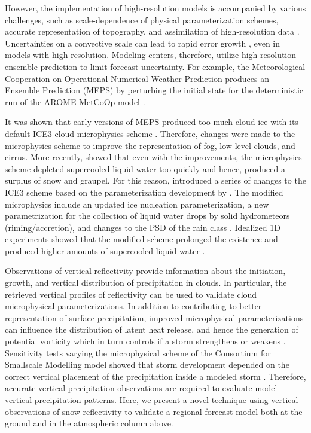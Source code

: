 \documentclass{ametsocV5}
\begin{document}
    However, the implementation of high-resolution models is accompanied by various challenges, such as scale-dependence of physical parameterization schemes, accurate representation of topography, and assimilation of high-resolution data \citep{sun_convective-scale_2005}. Uncertainties on a convective scale can lead to rapid error growth \citep{lorenz_atmospheric_1969}, even in models with high resolution. Modeling centers, therefore, utilize high-resolution ensemble prediction to limit forecast uncertainty. For example, the Meteorological Cooperation on Operational Numerical Weather Prediction produces an Ensemble Prediction (MEPS) by perturbing the initial state for the deterministic run of the  AROME-MetCoOp model \citep{frogner_convection-permitting_2019}. 
    
    It was shown that early versions of MEPS produced too much cloud ice with its default ICE3 cloud microphysics scheme \citep{muller_arome-metcoop:_2017}. Therefore, changes were made to the microphysics scheme to improve the representation of fog, low-level clouds, and cirrus. More recently, \citet{engdahl_improving_2020} showed that even with the improvements, the microphysics scheme depleted supercooled liquid water too quickly and hence, produced a surplus of snow and graupel. For this reason, \citet{engdahl_improving_2020} introduced a series of changes to the ICE3 scheme based on the parameterization development by \citet{thompson_explicit_2004,thompson_explicit_2008}. The modified microphysics include an updated ice nucleation parameterization, a new parametrization for the collection of liquid water drops by solid hydrometeors (riming/accretion), and changes to the PSD of the rain class \citep{engdahl_improving_2020}. Idealized 1D experiments showed that the modified scheme prolonged the existence and produced higher amounts of supercooled liquid water \citep{engdahl_improving_2020}.

    Observations of vertical reflectivity provide information about the initiation, growth, and vertical distribution of precipitation in clouds. In particular, the retrieved vertical profiles of reflectivity can be used to validate cloud microphysical parameterizations. In addition to contributing to better representation of surface precipitation, improved microphysical parameterizations can influence the distribution of latent heat release, and hence the generation of potential vorticity which in turn controls if a storm strengthens or weakens \citep{joos_influence_2012}. Sensitivity tests varying the microphysical scheme of the Consortium for Smallscale Modelling model showed that storm development depended on the correct vertical placement of the precipitation inside a modeled storm \citep{joos_influence_2012}. Therefore, accurate vertical precipitation observations are required to evaluate model vertical precipitation patterns. Here, we present a novel technique using vertical observations of snow reflectivity to validate a regional forecast model both at the ground and in the atmospheric column above.
\end{document}
